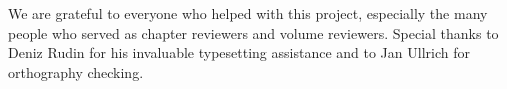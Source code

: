 \begin{refsection}

We are grateful to everyone who helped with this project, especially the many people who served as chapter reviewers and volume reviewers. Special thanks to Deniz Rudin for his invaluable typesetting assistance and to Jan Ullrich for orthography checking. 

\printbibliography[heading=subbibliography]
\end{refsection}

